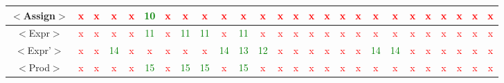 \documentclass{article}
\begin{document}
\begin{center}
\begin{table}[H]
\begin{tabular}{|c|c|c|c|c|c|c|c|c|c|c|c|c|c|c|c|c|c|c|c|c|c|c|c|c|c|}
\hline
 $<$Assign$>$       & \textcolor{red}{x}    & \textcolor{red}{x}  & \textcolor{red}{x}    & \textcolor{red}{x}    & \textcolor{green}{10}   & \textcolor{red}{x}  & \textcolor{red}{x}     & \textcolor{red}{x}     & \textcolor{red}{x}    & \textcolor{red}{x}     & \textcolor{red}{x}     & \textcolor{red}{x}     & \textcolor{red}{x}     & \textcolor{red}{x}     & \textcolor{red}{x}  & \textcolor{red}{x}     & \textcolor{red}{x}     & \textcolor{red}{x}     & \textcolor{red}{x}     & \textcolor{red}{x}     & \textcolor{red}{x}  & \textcolor{red}{x}    & \textcolor{red}{x}     & \textcolor{red}{x}      & \textcolor{red}{x} \\
\hline
 $<$Expr$>$         & \textcolor{red}{x}    & \textcolor{red}{x}  & \textcolor{red}{x}    & \textcolor{red}{x}    & \textcolor{green}{11}  & \textcolor{red}{x}  & \textcolor{green}{11}  & \textcolor{green}{11}  & \textcolor{red}{x}    & \textcolor{green}{11}  & \textcolor{red}{x}     & \textcolor{red}{x}     & \textcolor{red}{x}     & \textcolor{red}{x}     & \textcolor{red}{x}  & \textcolor{red}{x}     & \textcolor{red}{x}     & \textcolor{red}{x}     & \textcolor{red}{x}     & \textcolor{red}{x}     & \textcolor{red}{x}  & \textcolor{red}{x}    & \textcolor{red}{x}     & \textcolor{red}{x}      & \textcolor{red}{x} \\
\hline
 $<$Expr'$>$        & \textcolor{red}{x}    & \textcolor{red}{x}  & \textcolor{green}{14} & \textcolor{red}{x}    & \textcolor{red}{x}     & \textcolor{red}{x}  & \textcolor{red}{x}     & \textcolor{red}{x}     & \textcolor{green}{14} & \textcolor{green}{13}  & \textcolor{green}{12}  & \textcolor{red}{x}     & \textcolor{red}{x}     & \textcolor{red}{x}     & \textcolor{red}{x}  & \textcolor{red}{x}     & \textcolor{red}{x}     & \textcolor{green}{14}  & \textcolor{green}{14}  & \textcolor{red}{x}     & \textcolor{red}{x}  & \textcolor{red}{x}    & \textcolor{red}{x}     & \textcolor{red}{x}      & \textcolor{red}{x} \\
\hline
 $<$Prod$>$         & \textcolor{red}{x}    & \textcolor{red}{x}  & \textcolor{red}{x}    & \textcolor{red}{x}    & \textcolor{green}{15}  & \textcolor{red}{x}  & \textcolor{green}{15}  & \textcolor{green}{15}  & \textcolor{red}{x}    & \textcolor{green}{15}  & \textcolor{red}{x}     & \textcolor{red}{x}     & \textcolor{red}{x}     & \textcolor{red}{x}     & \textcolor{red}{x}  & \textcolor{red}{x}     & \textcolor{red}{x}     & \textcolor{red}{x}     & \textcolor{red}{x}     & \textcolor{red}{x}     & \textcolor{red}{x}  & \textcolor{red}{x}    & \textcolor{red}{x}     & \textcolor{red}{x}      & \textcolor{red}{x} \\

\end{tabular}
\end{table}
\end{center}
\end{document}
